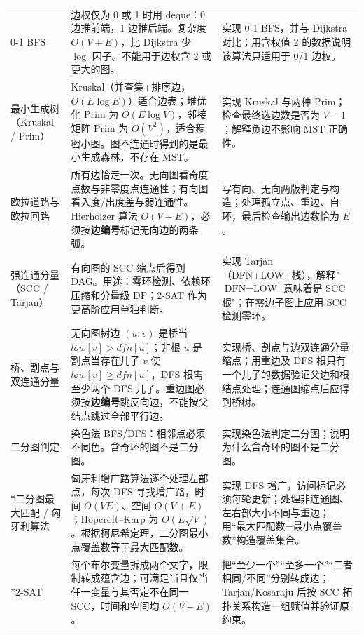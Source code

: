 \documentclass[a4paper,11pt]{article}
\begin{document}
\begin{longtable}{L{2.4cm} L{7.5cm} L{6.8cm}}
0-1 BFS
& 边权仅为 0 或 1 时用 deque：0 边推前端，1 边推后端。复杂度 $O(V+E)$，比 Dijkstra 少 $\log$ 因子。不能用于边权含 2 或更大的图。
& 实现 0-1 BFS，并与 Dijkstra 对比；用含权值 2 的数据说明该算法只适用于 0/1 边权。\\[2mm]

最小生成树（Kruskal / Prim）
& Kruskal（并查集+排序边，$O(E\log E)$）适合边表；堆优化 Prim 为 $O(E\log V)$，邻接矩阵 Prim 为 $O(V^2)$，适合稠密小图。图不连通时得到的是最小生成森林，不存在 MST。
& 实现 Kruskal 与两种 Prim；检查最终选边数是否为 $V-1$；解释负边不影响 MST 正确性。\\[2mm]

欧拉道路与欧拉回路
& 所有边恰走一次。无向图看奇度点数与非零度点连通性；有向图看入度/出度差与弱连通性。Hierholzer 算法 $O(V+E)$，必须按\textbf{边编号}标记无向边的两条弧。
& 写有向、无向两版判定与构造；处理孤立点、重边、自环，最后检查输出边数恰为 $E$。\\[2mm]

强连通分量（SCC / Tarjan）
& 有向图的 SCC 缩点后得到 DAG。用途：零环检测、依赖环压缩和分量级 DP；2-SAT 作为更高阶应用单独判断。
& 实现 Tarjan（DFN+LOW+栈），解释"$\text{DFN}=\text{LOW}$ 意味着是 SCC 根"；在零边子图上应用 SCC 检测零环。\\[2mm]

桥、割点与双连通分量
& 无向图树边 $(u,v)$ 是桥当 $low[v]>dfn[u]$；非根 $u$ 是割点当存在儿子 $v$ 使 $low[v]\ge dfn[u]$，DFS 根需至少两个 DFS 儿子。重边图必须按\textbf{边编号}跳反向边，不能按父结点跳过全部平行边。
& 实现桥、割点与边双连通分量缩点；用重边及 DFS 根只有一个儿子的数据验证父边和根结点处理；连通图缩点后应得到桥树。\\[2mm]

二分图判定
& 染色法 BFS/DFS：相邻点必须不同色。含奇环的图不是二分图。
& 实现染色法判定二分图；说明为什么含奇环的图不是二分图。\\[2mm]

*二分图最大匹配 / 匈牙利算法
& 匈牙利增广路算法逐个处理左部点，每次 DFS 寻找增广路，时间 $O(VE)$、空间 $O(V+E)$；Hopcroft--Karp 为 $O(E\sqrt V)$。根据柯尼希定理，二分图最小点覆盖数等于最大匹配数。
& 实现 DFS 增广，访问标记必须每轮更新；处理非连通图、左右部大小不同与重边；用“最大匹配数=最小点覆盖数”构造覆盖集合。\\[2mm]

*2-SAT
& 每个布尔变量拆成两个文字，限制转成蕴含边；可满足当且仅当任一变量与其否定不在同一 SCC，时间和空间均 $O(V+E)$。
& 把“至少一个”“至多一个”“二者相同/不同”分别转成边；Tarjan/Kosaraju 后按 SCC 拓扑关系构造一组赋值并验证原约束。\\[2mm]


\end{longtable}
\end{document}
